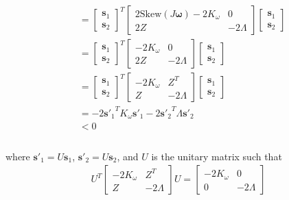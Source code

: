 \begin{equation}
\begin{aligned}
& =
\begin{bmatrix}
{\boldsymbol s}_1 \\
{\boldsymbol s}_2
\end{bmatrix} ^{T}
\begin{bmatrix}
2 {\text {Skew}}(J {\boldsymbol \omega}) - 2K_{\omega} & 0 \\
2Z &  -2 \Lambda
\end{bmatrix}
\begin{bmatrix}
{\boldsymbol s}_1 \\
{\boldsymbol s}_2
\end{bmatrix}\\
& = 
\begin{bmatrix}
{\boldsymbol s}_1 \\
{\boldsymbol s}_2
\end{bmatrix} ^{T}
\begin{bmatrix}
- 2K_{\omega} & 0 \\
2Z &  -2 \Lambda
\end{bmatrix}
\begin{bmatrix}
{\boldsymbol s}_1 \\
{\boldsymbol s}_2
\end{bmatrix}\\
& = 
\begin{bmatrix}
{\boldsymbol s}_1 \\
{\boldsymbol s}_2
\end{bmatrix} ^{T}
\begin{bmatrix}
- 2K_{\omega} & Z^{T} \\
Z &  -2 \Lambda
\end{bmatrix}
\begin{bmatrix}
{\boldsymbol s}_1 \\
{\boldsymbol s}_2
\end{bmatrix}\\
& =  - 2 {{\boldsymbol{s}'}_1}^{T} K_{\omega} {\boldsymbol{s}'}_1 - 2 {{\boldsymbol{s}'}_2}^{T} \Lambda {\boldsymbol{s}'}_2\\
& < 0 \\
\end{aligned}
\end{equation} \\
where \({\boldsymbol s'}_1 = U {\boldsymbol s}_1 \), \({\boldsymbol s'}_2 = U {\boldsymbol s}_2 \), and \(U\) is the unitary matrix such that
\begin{equation}
\begin{aligned}
U^{T}
\begin{bmatrix}
- 2K_{\omega} & Z^{T} \\
Z &  -2 \Lambda
\end{bmatrix}
U
=
\begin{bmatrix}
- 2K_{\omega} & 0 \\
0 &  -2 \Lambda
\end{bmatrix}\\
\end{aligned}
\end{equation}
